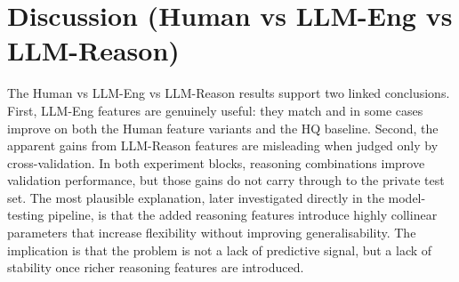 \documentclass{article}
\theoremstyle{plain}
\theoremstyle{definition}
\theoremstyle{remark}
\begin{document}
\begin{table}[t]
\centering
{}

\vspace{0.5em}

\caption{Validation vs private-test for HQ benchmark with reasoning combinations.}
\label{tab:paper-hq}
\end{table}

\section{Discussion (Human vs LLM-Eng vs LLM-Reason)}
The Human vs LLM-Eng vs LLM-Reason results support two linked conclusions. First, LLM-Eng features are genuinely useful: they match and in some cases improve on both the Human feature variants and the HQ baseline. Second, the apparent gains from LLM-Reason features are misleading when judged only by cross-validation. In both experiment blocks, reasoning combinations improve validation performance, but those gains do not carry through to the private test set. The most plausible explanation, later investigated directly in the model-testing pipeline, is that the added reasoning features introduce highly collinear parameters that increase flexibility without improving generalisability. The implication is that the problem is not a lack of predictive signal, but a lack of stability once richer reasoning features are introduced.
\end{document}
